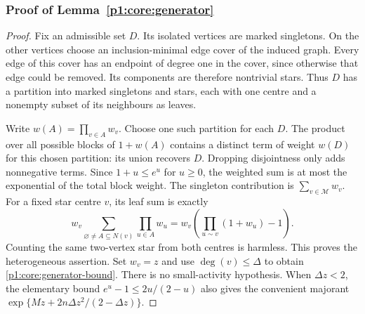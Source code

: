 \subsubsection{Proof of Lemma~\ref{p1:core:generator}}
\label{p14:comp:certificate-generator}

\begin{proof}
Fix an admissible set $D$. Its isolated vertices are marked singletons.
On the other vertices choose an inclusion-minimal edge cover of the
induced graph. Every edge of this cover has an endpoint of degree one
in the cover, since otherwise that edge could be removed. Its
components are therefore nontrivial stars. Thus $D$ has a partition
into marked singletons and stars, each with one centre and a nonempty
subset of its neighbours as leaves.

Write $w(A)=\prod_{v\in A}w_v$. Choose one such partition for each $D$.
The product over all possible blocks of $1+w(A)$ contains a distinct
term of weight $w(D)$ for this chosen partition: its union recovers
$D$. Dropping disjointness only adds nonnegative terms. Since
$1+u\le e^u$ for $u\ge0$, the weighted sum is at most the exponential
of the total block weight. The singleton contribution is
$\sum_{v\in\mathcal M}w_v$. For a fixed star centre $v$, its leaf sum
is exactly
\[
 w_v\sum_{\varnothing\ne A\subseteq N(v)}\prod_{u\in A}w_u
   =w_v\left(\prod_{u\sim v}(1+w_u)-1\right).
\]
Counting the same two-vertex star from both centres is harmless.
This proves the heterogeneous assertion. Set $w_v=z$ and use
$\deg(v)\le\Delta$ to obtain \eqref{p1:core:generator-bound}.
There is no small-activity hypothesis. When $\Delta z<2$, the
elementary bound $e^u-1\le2u/(2-u)$ also gives the convenient
majorant $\exp\{Mz+2n\Delta z^2/(2-\Delta z)\}$.
\end{proof}
